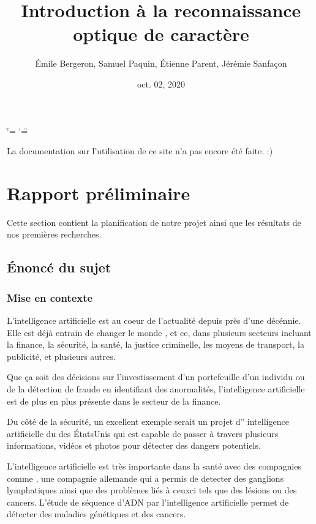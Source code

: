 \documentclass[letterpaper,10pt,french]{sphinxmanual}
\title{Introduction à la reconnaissance optique de caractère}
\date{oct. 02, 2020}
\author{Émile Bergeron, Samuel Paquin, Étienne Parent, Jérémie Sanfaçon}
\begin{document}
\ifdefined\shorthandoff
  \ifnum\catcode`\=\string=\active\shorthandoff{=}\fi
  \ifnum\catcode`\"=\active{}\fi
\fi

\pagestyle{empty}
\sphinxmaketitle
\pagestyle{plain}
\sphinxtableofcontents
\pagestyle{normal}
\label{\detokenize{intro::doc}}


La documentation sur l’utilisation de ce site n’a pas encore été faite. :)


\chapter{Rapport préliminaire}
\label{\detokenize{rapport_preliminaire:rapport-preliminaire}}\label{\detokenize{rapport_preliminaire::doc}}
Cette section contient la planification de notre projet ainsi que les
résultats de nos premières recherches.


\section{Énoncé du sujet}
\label{\detokenize{enonce_sujet:enonce-du-sujet}}\label{\detokenize{enonce_sujet::doc}}

\subsection{Mise en contexte}
\label{\detokenize{enonce_sujet:mise-en-contexte}}
L’intelligence artificielle est au coeur de l’actualité depuis près d’une
décénnie. Elle est déjà entrain de changer le monde , et ce, dans plusieurs
secteurs incluant la finance, la sécurité, la santé, la justice criminelle,
les moyens de transport, la publicité, et plusieurs autres.

Que ça soit des décisions sur l’investissement d’un portefeuille
d’un individu ou de la détection de fraude en identifiant des anormalités, l’intelligence
artificielle est de plus en plus présente dans le secteur de la finance. 

Du côté de la
sécurité, un excellent exemple serait 
un projet d” intelligence artificielle du 
des États\sphinxhyphen{}Unis qui est capable de passer à travers plusieurs informations,
vidéos et photos pour détecter des dangers potentiels.

L’intelligence artificielle est très importante dans la santé avec des compagnies comme
, une compagnie allemande qui a permis de detecter
des ganglions lymphatiques ainsi que des problèmes liés à ceux\sphinxhyphen{}ci tels que des lésions
ou des cancers. L’étude de séquence d’ADN par l’intelligence artificielle permet de détecter
des maladies génétiques et des cancers.
\end{document}
